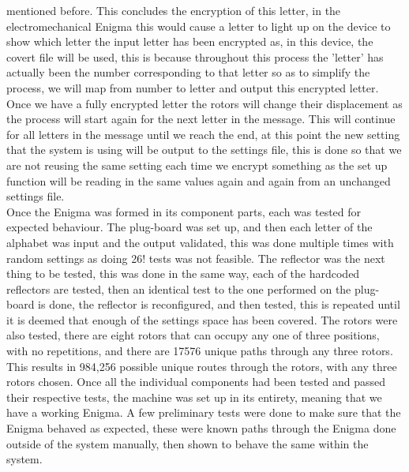 \documentclass[12pt,a4paper]{article}
\begin{document}
mentioned before. This concludes the encryption of this letter, in the electromechanical Enigma this would cause a letter to light up on the device to show which letter the input letter has been encrypted as, in this device, the covert file will be used, this is because throughout this process the 'letter' has actually been the number corresponding to that letter so as to simplify the process, we will map from number to letter and output this encrypted letter. Once we have a fully encrypted letter the rotors will change their displacement as the process will start again for the next letter in the message. This will continue for all letters in the message until we reach the end, at this point the new setting that the system is using will be output to the settings file, this is done so that we are not reusing the same setting each time we encrypt something as the set up function will be reading in the same values again and again from an unchanged settings file.\\

Once the Enigma was formed in its component parts, each was tested for expected behaviour. The plug-board was set up, and then each letter of the alphabet was input and the output validated, this was done multiple times with random settings as doing 26! tests was not feasible. The reflector was the next thing to be tested, this was done in the same way, each of the hardcoded reflectors are tested, then an identical test to the one performed on the plug-board is done, the reflector is reconfigured, and then tested, this is repeated until it is deemed that enough of the settings space has been covered. The rotors were also tested, there are eight rotors that can occupy any one of three positions, with no repetitions, and there are 17576 unique paths through any three rotors. This results in 984,256 possible unique routes through the rotors, with any three rotors chosen. Once all the individual components had been tested and passed their respective tests, the machine was set up in its entirety, meaning that we have a working Enigma. A few preliminary tests were done to make sure that the Enigma behaved as expected, these were known paths through the Enigma done outside of the system manually, then shown to behave the same within the system.\\
\end{document}
